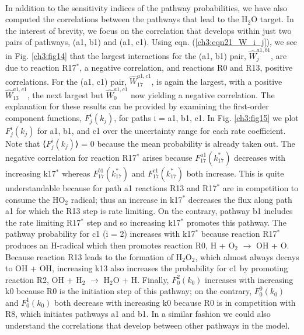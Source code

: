 \paragraph{}
In addition to the sensitivity indices of the pathway
probabilities, we have also computed the correlations between
the pathways that lead to the H$_2$O target. In the interest of
brevity, we focus on the correlation that develops within just
two pairs of pathways, (a1, b1) and (a1, c1). Using eqn. (\ref{ch3:eqn21_W_i_j}), we
see in Fig. \ref{ch3:fig14} that the largest interactions for the (a1, b1)
pair, ${\widehat{W}}_j^{a1,b1}$, are due to reaction R17$^\ast$, a negative correlation,
and reactions R0 and R13, positive correlations. For the (a1, c1) pair, ${\widehat{W}}_{17}^{a1,c1}$, is again the largest, with a positive ${\widehat{W}}_{13}^{a1,c1}$, the
next largest but ${\widehat{W}}_0^{a1,c1}$ now yielding a negative correlation. The
explanation for these results can be provided by examining the
first-order component functions, $F_j^ i (k_j)$, for paths i = a1, b1, c1.
In Fig. \ref{ch3:fig15} we plot $F_j^ i (k_j)$ for a1, b1, and c1 over the
uncertainty range for each rate coefficient. Note that ⟨$F_j^ i (k_j)$⟩ =
0 because the mean probability is already taken out. The negative correlation for reaction R17$^{\ast}$ arises because $F_{17}^{a1}(k_{17}^{\ast})$ decreases with increasing k17$^\ast$ whereas $F_{17}^{b1}(k_{17}^{\ast})$ and $F_{17}^{c1}(k_{17}^{\ast})$ both increase. This is quite understandable because for path a1
reactions R13 and R17$^{\ast}$ are in competition to consume the
HO$_2$ radical; thus an increase in k17$^\ast$ decreases the flux along
path a1 for which the R13 step is rate limiting. On the contrary,
pathway b1 includes the rate limiting R17$^\ast$ step and so
increasing k17$^\ast$ promotes this pathway. The pathway probability
for c1 (i = 2) increases with k17$^\ast$ because reaction R17$^\ast$
produces an H-radical which then promotes reaction R0, H +
O$_2$ $\rightarrow$ OH + O. Because reaction R13 leads to the formation of
H$_2$O$_2$, which almost always decays to OH + OH, increasing k13
also increases the probability for c1 by promoting reaction R2,
OH + H$_2$ $\rightarrow$ H$_2$O + H. Finally, $F_{0}^{2}(k_0)$ increases with increasing
k0 because R0 is the initiation step of this pathway; on the contrary, $F_{0}^{0}(k_0)$ and $F_{0}^{1}(k_0)$ both decrease with increasing k0 because R0 is in competition with R8, which initiates pathways
a1 and b1. In a similar fashion we could also understand the
correlations that develop between other pathways in the model.
